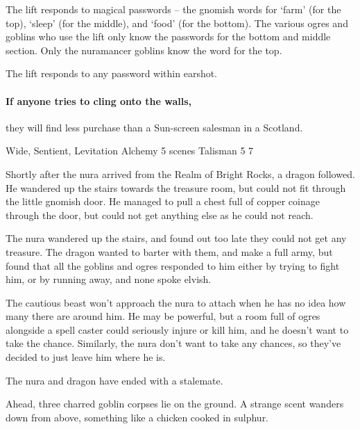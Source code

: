 \begin{multicols}{2}
The lift responds to magical passwords -- the gnomish words for `farm' (for the top), `sleep' (for the middle), and `food' (for the bottom).
The various ogres and goblins who use the lift only know the passwords for the bottom and middle section.
Only the nuramancer goblins know the word for the top.

The lift responds to any password within earshot.

\paragraph{If anyone tries to cling onto the walls,}
they will find less purchase than a Sun-screen salesman in a Scotland.

%
{Wide, Sentient, Levitation}%
{Alchemy}%
{5 scenes}%
{Talisman}%
{5}%
{7}



\begin{exampletext}

	Shortly after the nura arrived from the Realm of Bright Rocks, a dragon followed.
	He wandered up the stairs towards the treasure room, but could not fit through the little gnomish door.
	He managed to pull a chest full of copper coinage through the door, but could not get anything else as he could not reach.

	The nura wandered up the stairs, and found out too late they could not get any treasure.
	The dragon wanted to barter with them, and make a full army, but found that all the goblins and ogres responded to him either by trying to fight him, or by running away, and none spoke elvish.

	The cautious beast won't approach the nura to attach when he has no idea how many there are around him.
	He may be powerful, but a room full of ogres alongside a spell caster could seriously injure or kill him, and he doesn't want to take the chance.
	Similarly, the nura don't want to take any chances, so they've decided to just leave him where he is.

	The nura and dragon have ended with a stalemate.

\end{exampletext}

\begin{boxtext}

	Ahead, three charred goblin corpses lie on the ground.
	A strange scent wanders down from above, something like a chicken cooked in sulphur.


\end{boxtext}
\end{multicols}
